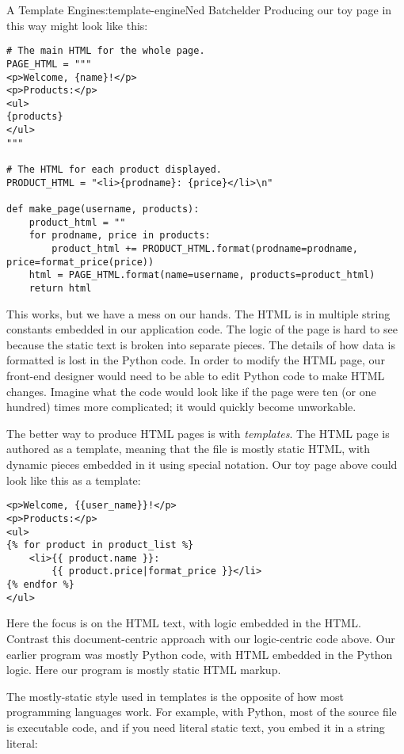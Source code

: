 \begin{aosachapter}{A Template Engine}{s:template-engine}{Ned Batchelder}
Producing our toy page in this way might look like this:

\begin{verbatim}
# The main HTML for the whole page.
PAGE_HTML = """
<p>Welcome, {name}!</p>
<p>Products:</p>
<ul>
{products}
</ul>
"""

# The HTML for each product displayed.
PRODUCT_HTML = "<li>{prodname}: {price}</li>\n"

def make_page(username, products):
    product_html = ""
    for prodname, price in products:
        product_html += PRODUCT_HTML.format(prodname=prodname, price=format_price(price))
    html = PAGE_HTML.format(name=username, products=product_html)
    return html
\end{verbatim}

This works, but we have a mess on our hands. The HTML is in multiple
string constants embedded in our application code. The logic of the page
is hard to see because the static text is broken into separate pieces.
The details of how data is formatted is lost in the Python code. In
order to modify the HTML page, our front-end designer would need to be
able to edit Python code to make HTML changes. Imagine what the code
would look like if the page were ten (or one hundred) times more
complicated; it would quickly become unworkable.

\label{templates}

The better way to produce HTML pages is with \emph{templates}. The HTML
page is authored as a template, meaning that the file is mostly static
HTML, with dynamic pieces embedded in it using special notation. Our toy
page above could look like this as a template:

\begin{verbatim}
<p>Welcome, {{user_name}}!</p>
<p>Products:</p>
<ul>
{% for product in product_list %}
    <li>{{ product.name }}:
        {{ product.price|format_price }}</li>
{% endfor %}
</ul>
\end{verbatim}

Here the focus is on the HTML text, with logic embedded in the HTML.
Contrast this document-centric approach with our logic-centric code
above. Our earlier program was mostly Python code, with HTML embedded in
the Python logic. Here our program is mostly static HTML markup.

The mostly-static style used in templates is the opposite of how most
programming languages work. For example, with Python, most of the source
file is executable code, and if you need literal static text, you embed
it in a string literal:


\end{aosachapter}
